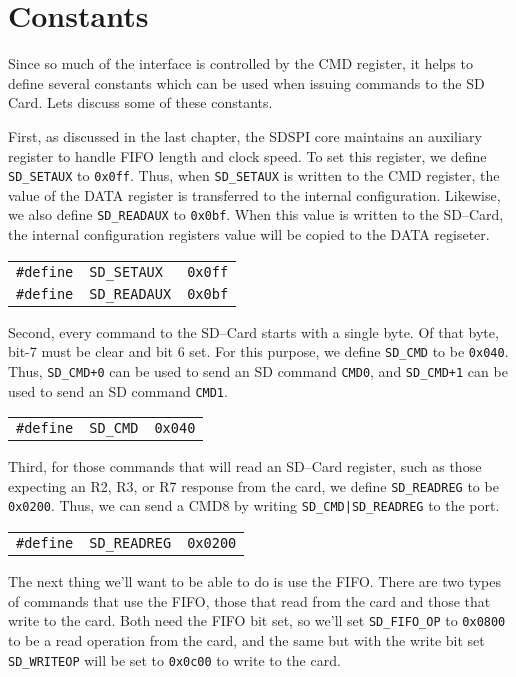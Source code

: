 \documentclass{gqtekspec}
\begin{document}
\section{Constants}
Since so much of the interface is controlled by the CMD register, it helps to
define several constants which can be used when issuing commands to the SD
Card.  Lets discuss some of these constants.

First, as discussed in the last chapter, the SDSPI core maintains an auxiliary
register to handle FIFO length and clock speed.  To set this register, we
define {\tt SD\_SETAUX} to {\tt 0x0ff}.  Thus, when {\tt SD\_SETAUX} is written
to the CMD register, the value of the DATA register is transferred to the
internal configuration.  Likewise, we also define {\tt SD\_READAUX} to
{\tt 0x0bf}.  When this value is written to the SD--Card, the internal
configuration registers value will be copied to the DATA regiseter.
\begin{tabular}{lll}
{\tt \#define} & {\tt SD\_SETAUX} & {\tt 0x0ff} \\
{\tt \#define} & {\tt SD\_READAUX}  & {\tt 0x0bf}
\end{tabular}

Second, every command to the SD--Card starts with a single byte.  Of that byte,
bit-7 must be clear and bit 6 set.  For this purpose, we define {\tt SD\_CMD}
to be {\tt 0x040}.  Thus, {\tt SD\_CMD+0} can be used to send an SD command
{\tt CMD0}, and {\tt SD\_CMD+1} can be used to send an SD command {\tt CMD1}.
\begin{tabular}{lll}
{\tt \#define} & {\tt SD\_CMD} & {\tt 0x040}
\end{tabular}

Third, for those commands that will read an SD--Card register, such as those
expecting an R2, R3, or R7 response from the card, we define {\tt SD\_READREG}
to be {\tt 0x0200}.  Thus, we can send a CMD8 by writing
\hbox{\tt SD\_CMD|SD\_READREG} to the port.
\begin{tabular}{lll}
{\tt \#define} & {\tt SD\_READREG} & {\tt 0x0200}
\end{tabular}

The next thing we'll want to be able to do is use the FIFO.  There are two
types of commands that use the FIFO, those that read from the card and those
that write to the card.  Both need the FIFO bit set, so we'll set
{\tt SD\_FIFO\_OP} to {\tt 0x0800} to be a read operation from the card, and
the same but with the write bit set {\tt SD\_WRITEOP} will be set to
{\tt 0x0c00} to write to the card.
\end{document}
